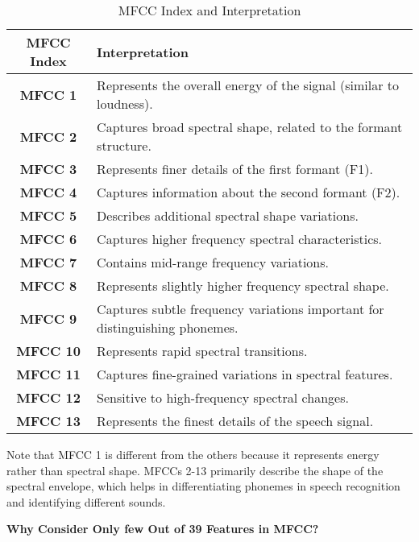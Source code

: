 \documentclass{article}
\begin{document}
\begin{enumerate}
    \begin{table}[h!]
        \centering
        \begin{tabular}{|c|l|}
            \hline
            \textbf{MFCC Index} & \textbf{Interpretation} \\
            \hline
            \textbf{MFCC 1}  & Represents the overall energy of the signal (similar to loudness). \\
            \textbf{MFCC 2}  & Captures broad spectral shape, related to the formant structure. \\
            \textbf{MFCC 3}  & Represents finer details of the first formant (F1). \\
            \textbf{MFCC 4}  & Captures information about the second formant (F2). \\
            \textbf{MFCC 5}  & Describes additional spectral shape variations. \\
            \textbf{MFCC 6}  & Captures higher frequency spectral characteristics. \\
            \textbf{MFCC 7}  & Contains mid-range frequency variations. \\
            \textbf{MFCC 8}  & Represents slightly higher frequency spectral shape. \\
            \textbf{MFCC 9}  & Captures subtle frequency variations important for distinguishing phonemes. \\
            \textbf{MFCC 10} & Represents rapid spectral transitions. \\
            \textbf{MFCC 11} & Captures fine-grained variations in spectral features. \\
            \textbf{MFCC 12} & Sensitive to high-frequency spectral changes. \\
            \textbf{MFCC 13} & Represents the finest details of the speech signal. \\
            \hline
        \end{tabular}
        \caption{MFCC Index and Interpretation}
        \label{tab:mfcc}
    \end{table}
    
    Note that MFCC 1 is different from the others because it represents energy rather than spectral shape.
    MFCCs 2-13 primarily describe the shape of the spectral envelope, which helps in differentiating phonemes in speech recognition and identifying different sounds.
    
    \textbf{Why Consider Only few Out of 39 Features in MFCC?}
    

\end{enumerate}
\end{document}
